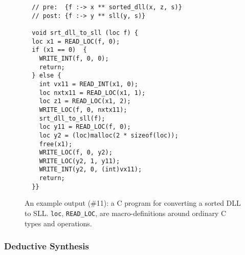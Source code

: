 % 

  \begin{figure}[!t]
    \centering  
    \begin{minipage}[b]{0.56\textwidth}
        \centering
        {\footnotesize{
        
        }}
      \caption{Example programs synthesised by \suslik from SL
        specifications stated using predicates produced by \tool.}
      
      \label{tab:results}
    \end{minipage}
    \hfill
    \begin{minipage}[b]{0.4\textwidth}
      \centering
      
  \begin{verbatim}
  // pre:  {f :-> x ** sorted_dll(x, z, s)}
  // post: {f :-> y ** sll(y, s)}
  
  void srt_dll_to_sll (loc f) {
  loc x1 = READ_LOC(f, 0);
  if (x1 == 0)  {
    WRITE_INT(f, 0, 0);
    return;
  } else {
    int vx11 = READ_INT(x1, 0);
    loc nxtx11 = READ_LOC(x1, 1);
    loc z1 = READ_LOC(x1, 2);
    WRITE_LOC(f, 0, nxtx11);
    srt_dll_to_sll(f);
    loc y11 = READ_LOC(f, 0);
    loc y2 = (loc)malloc(2 * sizeof(loc));
    free(x1);
    WRITE_LOC(f, 0, y2);
    WRITE_LOC(y2, 1, y11);
    WRITE_INT(y2, 0, (int)vx11);
    return;
  }}
  \end{verbatim}
  \caption{An example \suslik output (\#{11}): a C program for
    converting a sorted DLL to SLL. \texttt{loc}, \texttt{READ\_LOC},
    \etc are macro-definitions around ordinary C types and operations. }
          \label{fig:transform}
  \end{minipage}
  \end{figure}


\subsubsection{Deductive Synthesis}
\label{sec:synthesis}

